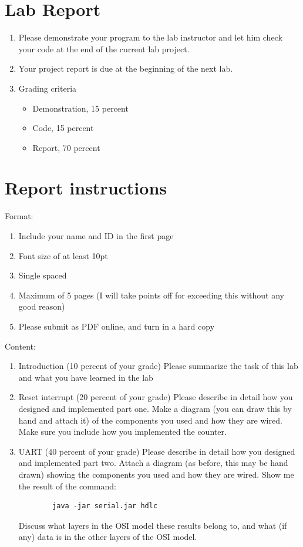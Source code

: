 \documentclass[letterpaper,12pt]{article}
\begin{document}
\section*{Lab Report}
\begin{enumerate}
   \item Please demonstrate your program to the lab instructor and let him check your code at the end of the current lab project.
   \item Your project report is due at the beginning of the next lab.
   \item Grading criteria
      \begin{itemize}
         \item Demonstration, 15 percent
         \item Code, 15 percent
         \item Report, 70 percent
      \end{itemize}
\end{enumerate}
\section*{Report instructions}
Format:
\begin{enumerate}
   \item Include your name and ID in the first page
   \item Font size of at least 10pt
   \item Single spaced
   \item Maximum of 5 pages (I will take points off for exceeding this without any good reason)
   \item Please submit as PDF online, and turn in a hard copy
\end{enumerate}
Content:
\begin{enumerate}
   \item Introduction (10 percent of your grade) Please summarize the task of this lab and what you have learned in the lab
   \item Reset interrupt (20 percent of your grade) Please describe in detail how you designed
       and implemented part one. Make a diagram (you can draw this by hand and attach it) of the
       components you used and how they are wired. Make sure you include how you implemented the counter.
    \item UART (40 percent of your grade) Please describe in detail how you designed and implemented part
        two. Attach a diagram (as before, this may be hand drawn) showing the components you used and
        how they are wired. Show me the result of the command:
        \begin{lstlisting}
        java -jar serial.jar hdlc
        \end{lstlisting}
        Discuss what layers in the OSI model these results belong to, and what (if any) data is in the other layers of the OSI model.
\end{enumerate}
\end{document}

